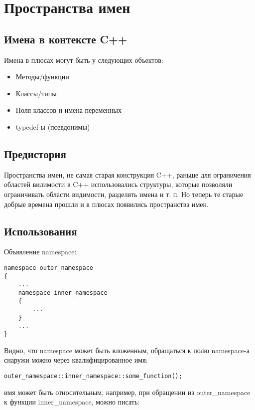 \chapter{Пространства имен}

\section{Имена в контексте C++}

Имена в плюсах могут быть у следующих объектов:

\begin{itemize}
\item Методы/функции

\item Классы/типы

\item Поля классов и имена переменных

\item typedef-ы (псевдонимы)
\end{itemize}

\section{Предистория}

Пространства имен, не самая старая конструкция C++, раньше для ограничения областей вилимости в C++ использовались структуры, которые
позволяли ограничивать области видимости, разделять имена и т. п. Но теперь те старые добрые времена прошли и в плюсах появились пространства
имен.

\section{Использования}

Объявление namespace:

\begin{lstlisting}
namespace outer_namespace
{
	...
	namespace inner_namespace
	{
		...
	}
	...
}
\end{lstlisting}

Видно, что namespace может быть вложенным, обращаться к полю namespace-а снаружи можно через квалифицированное имя:

\begin{lstlisting}
outer_namespace::inner_namespace::some_function();
\end{lstlisting}

имя может быть относительным, например, при обращении из outer\_namespace к функции inner\_namespace, можно писать:

